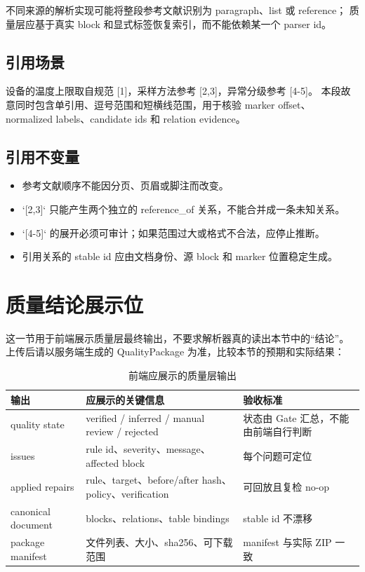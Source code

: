 \documentclass[UTF8,a4paper,11pt]{ctexart}
\begin{document}
不同来源的解析实现可能将整段参考文献识别为 paragraph、list 或 reference；
质量层应基于真实 block 和显式标签恢复索引，而不能依赖某一个 parser id。

\subsection{引用场景}

设备的温度上限取自规范 [1]，采样方法参考 [2,3]，异常分级参考 [4-5]。
本段故意同时包含单引用、逗号范围和短横线范围，用于核验 marker offset、
normalized labels、candidate ids 和 relation evidence。

\subsection{引用不变量}

\begin{itemize}[leftmargin=2em]
  \item 参考文献顺序不能因分页、页眉或脚注而改变。
  \item `[2,3]` 只能产生两个独立的 reference\_of 关系，不能合并成一条未知关系。
  \item `[4-5]` 的展开必须可审计；如果范围过大或格式不合法，应停止推断。
  \item 引用关系的 stable id 应由文档身份、源 block 和 marker 位置稳定生成。
\end{itemize}

\section{质量结论展示位}

这一节用于前端展示质量层最终输出，不要求解析器真的读出本节中的“结论”。
上传后请以服务端生成的 QualityPackage 为准，比较本节的预期和实际结果：

\begin{table}[htbp]
\centering
\caption{前端应展示的质量层输出}
\small
\begin{tabularx}{\textwidth}{C{0.24\textwidth} Y C{0.20\textwidth}}
\toprule
输出 & 应展示的关键信息 & 验收标准 \\
\midrule
quality state & verified / inferred / manual review / rejected & 状态由 Gate 汇总，不能由前端自行判断 \\
issues & rule id、severity、message、affected block & 每个问题可定位 \\
applied repairs & rule、target、before/after hash、policy、verification & 可回放且复检 no-op \\
canonical document & blocks、relations、table bindings & stable id 不漂移 \\
package manifest & 文件列表、大小、sha256、可下载范围 & manifest 与实际 ZIP 一致 \\
\bottomrule
\end{tabularx}
\end{table}
\end{document}
